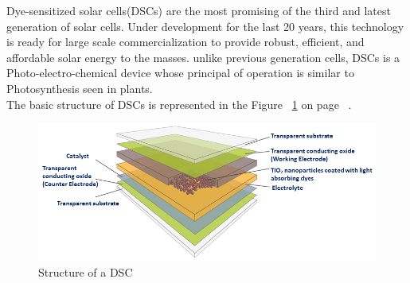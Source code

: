   Dye-sensitized solar cells(\ac{DSCs}) are the most promising of the third and latest generation of solar cells. Under development for the last 20 years, this technology is ready for large scale commercialization to provide robust, efficient, and affordable solar energy to the masses. unlike previous generation cells, \ac{DSCs} is a Photo-electro-chemical device whose principal of operation is similar to Photosynthesis seen in plants.\\
  

The basic structure of \ac{DSCs} is represented in the Figure ~\ref{fig:DSC_struc} on page ~\pageref{fig:DSC_struc}. 

\begin{figure}[H]
\begin{center}
\includegraphics[width=\textwidth]{images/DSCs_struc}
\caption{Structure of a DSC }
\label{fig:DSC_struc}
\end{center}
\end{figure}

